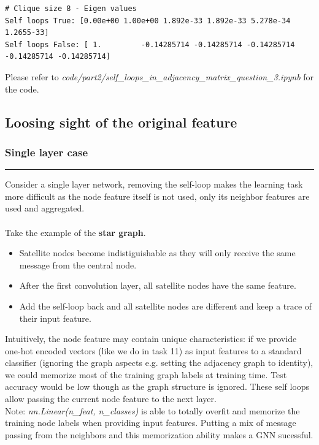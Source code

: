 \documentclass[a4paper]{article}
\begin{document}
\begin{verbatim}
# Clique size 8 - Eigen values
Self loops True: [0.00e+00 1.00e+00 1.892e-33 1.892e-33 5.278e-34 1.2655-33]
Self loops False: [ 1.         -0.14285714 -0.14285714 -0.14285714 -0.14285714 -0.14285714]
\end{verbatim}

Please refer to \textit{code/part2/self\_loops\_in\_adjacency\_matrix\_question\_3.ipynb} for the code.
\subsection*{Loosing sight of the original feature}
\subsubsection*{Single layer case}
\hrule

Consider a single layer network, removing the self-loop makes the learning task more difficult as the node feature itself is not used, only its neighbor features are used and aggregated.
\\
\\
Take the example of the \textbf{star graph}. 
\begin{itemize}
    \item Satellite nodes become indistiguishable as they will only receive the same message from the central node. 
    \item After the first convolution layer, all satellite nodes have the same feature.
    \item Add the self-loop back and all satellite nodes are different and keep a trace of their input feature.
\end{itemize}

Intuitively, the node feature may contain unique characteristics: 
if we provide one-hot encoded vectors (like we do in task 11) as input features to a standard classifier (ignoring the graph aspects e.g. setting the adjacency graph to identity),
we could memorize most of the training graph labels at training time. Test accuracy would be low though as the graph structure is ignored.
These self loops allow passing the current node feature to the next layer.\\
Note: \textit{nn.Linear(n\_feat, n\_classes)} is able to totally overfit and memorize the training node labels when providing input features.
Putting a mix of message passing from the neighbors and this memorization ability makes a GNN sucessful.
\end{document}
